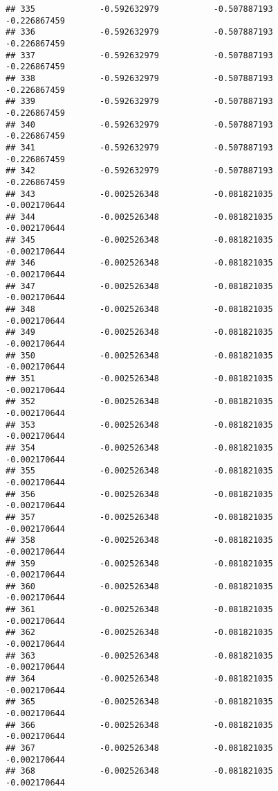 \documentclass[]{article}
\begin{document}
\begin{verbatim}
## 335             -0.592632979           -0.507887193           -0.226867459
## 336             -0.592632979           -0.507887193           -0.226867459
## 337             -0.592632979           -0.507887193           -0.226867459
## 338             -0.592632979           -0.507887193           -0.226867459
## 339             -0.592632979           -0.507887193           -0.226867459
## 340             -0.592632979           -0.507887193           -0.226867459
## 341             -0.592632979           -0.507887193           -0.226867459
## 342             -0.592632979           -0.507887193           -0.226867459
## 343             -0.002526348           -0.081821035           -0.002170644
## 344             -0.002526348           -0.081821035           -0.002170644
## 345             -0.002526348           -0.081821035           -0.002170644
## 346             -0.002526348           -0.081821035           -0.002170644
## 347             -0.002526348           -0.081821035           -0.002170644
## 348             -0.002526348           -0.081821035           -0.002170644
## 349             -0.002526348           -0.081821035           -0.002170644
## 350             -0.002526348           -0.081821035           -0.002170644
## 351             -0.002526348           -0.081821035           -0.002170644
## 352             -0.002526348           -0.081821035           -0.002170644
## 353             -0.002526348           -0.081821035           -0.002170644
## 354             -0.002526348           -0.081821035           -0.002170644
## 355             -0.002526348           -0.081821035           -0.002170644
## 356             -0.002526348           -0.081821035           -0.002170644
## 357             -0.002526348           -0.081821035           -0.002170644
## 358             -0.002526348           -0.081821035           -0.002170644
## 359             -0.002526348           -0.081821035           -0.002170644
## 360             -0.002526348           -0.081821035           -0.002170644
## 361             -0.002526348           -0.081821035           -0.002170644
## 362             -0.002526348           -0.081821035           -0.002170644
## 363             -0.002526348           -0.081821035           -0.002170644
## 364             -0.002526348           -0.081821035           -0.002170644
## 365             -0.002526348           -0.081821035           -0.002170644
## 366             -0.002526348           -0.081821035           -0.002170644
## 367             -0.002526348           -0.081821035           -0.002170644
## 368             -0.002526348           -0.081821035           -0.002170644

\end{verbatim}
\end{document}
